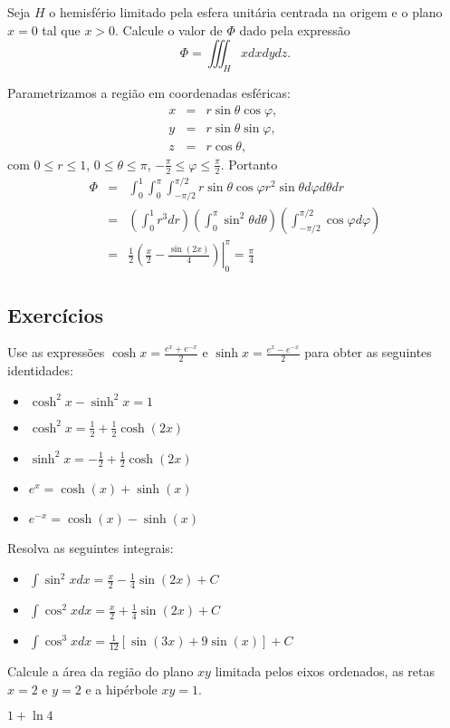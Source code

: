 \begin{exeresol} Seja $H$ o hemisfério limitado pela esfera unitária centrada na origem e o plano $x=0$ tal que $x>0$. Calcule o valor de $\Phi$ dado pela expressão
$$\Phi=\iiint_Hx dxdydz.$$ 
\end{exeresol}
\begin{resol}Parametrizamos a região em coordenadas esféricas:
\begin{eqnarray*}
x&=&r\sin\theta\cos\varphi,\\ y&=&r\sin\theta\sin\varphi,\qquad \\z&=&r\cos\theta,
\end{eqnarray*}
com $0\leq r \leq 1$, $0\leq \theta\leq {\pi}$, $-\frac{\pi}{2}\leq \varphi\leq \frac{\pi}{2}$.  
Portanto
\begin{eqnarray*}
\Phi&=&\int_0^1\int_0^\pi\int_{-\pi/2}^{\pi/2}r\sin\theta\cos\varphi r^2\sin\theta d\varphi d\theta dr\\
&=&\left(\int_0^1r^3dr\right)\left(\int_0^\pi\sin^2\theta d\theta \right)\left(\int_{-\pi/2}^{\pi/2}\cos\varphi d\varphi\right)\\
&=&\frac{1}{2}\left.\left(\frac{x}{2}-\frac{\sin(2x)}{4}\right)\right|_0^{\pi}=\frac{\pi}{4}
\end{eqnarray*}
\end{resol}


\subsection*{Exercícios}


\begin{exer}Use as expressões $\cosh x=\frac{e^x+e^{-x}}{2}$ e $\sinh x=\frac{e^x-e^{-x}}{2}$ para obter as seguintes identidades:
\begin{itemize}
\item $\cosh^2x-\sinh^2x=1$
\item $\cosh^2x=\frac{1}{2}+\frac{1}{2}\cosh(2x)$
\item $\sinh^2x=-\frac{1}{2}+\frac{1}{2}\cosh(2x)$
\item $e^x=\cosh(x)+\sinh(x)$
\item $e^{-x}=\cosh(x)-\sinh(x)$

\end{itemize}
\end{exer}

\begin{exer}Resolva as seguintes integrais:
\begin{itemize}
\item $\int \sin^2xdx=\frac{x}{2}-\frac{1}{4}\sin(2x)+C$
\item $\int \cos^2xdx=\frac{x}{2}+\frac{1}{4}\sin(2x)+C$
\item $\int \cos^3xdx=\frac{1}{12}\left[\sin(3x)+9\sin(x)\right]+C$
\end{itemize}
\end{exer}


\begin{exer}Calcule a área da região do plano $xy$ limitada pelos eixos ordenados, as retas $x=2$ e $y=2$ e a hipérbole $xy=1$.
\end{exer}
\begin{resp}
$1+\ln4$ 
\end{resp}


